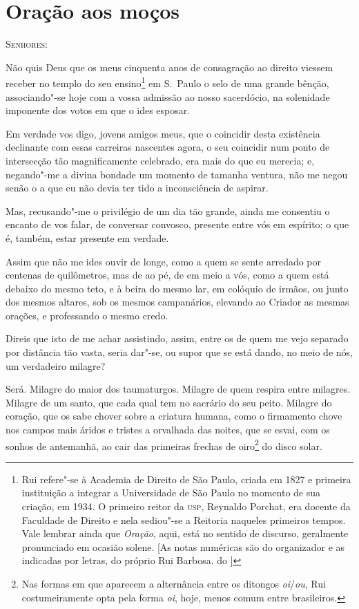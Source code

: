 \chapter*{Oração aos moços}

\textsc{Senhores:}

Não quis Deus que os meus cinquenta anos de consagração ao direito
viessem receber no templo do seu ensino\footnote{ Rui refere"-se à
Academia de Direito de São Paulo, criada em 1827 e primeira
instituição a integrar a Universidade de São Paulo no momento de sua
criação, em 1934. O primeiro reitor da \textsc{usp}, Reynaldo Porchat,
era docente da Faculdade de Direito e nela sediou"-se a Reitoria
naqueles primeiros tempos. Vale lembrar ainda que \textit{Oração}, aqui, 
está no sentido de discurso, geralmente pronunciado em ocasião solene. [As notas numéricas são 
do organizador e as indicadas por letras, do próprio Rui Barbosa.  do ]} 
em S.~Paulo o selo de uma grande bênção, associando"-se hoje com a 
vossa admissão ao nosso sacerdócio, na solenidade imponente dos votos em que o ides esposar.

Em verdade vos digo, jovens amigos meus, que o coincidir desta
existência declinante com essas carreiras nascentes agora, o seu
coincidir num ponto de intersecção tão magnificamente celebrado, era
mais do que eu merecia; e, negando"-me a divina bondade um momento de
tamanha ventura, não me negou senão o a que eu não devia ter tido a
inconsciência de aspirar.

Mas, recusando"-me o privilégio de um dia tão grande, ainda me
consentiu o encanto de vos falar, de conversar convosco, presente entre
vós em espírito; o que é, também, estar presente em verdade.

Assim que não me ides ouvir de longe, como a quem se sente
arredado por centenas de quilômetros, mas de ao pé, de em meio a vós,
como a quem está debaixo do mesmo teto, e à beira do mesmo lar, em
colóquio de irmãos, ou junto dos mesmos altares, sob os mesmos
campanários, elevando ao Criador as mesmas orações, e professando o
mesmo credo.

Direis que isto de me achar assistindo, assim, entre os de quem me
vejo separado por distância tão vasta, seria dar"-se, ou supor que se
está dando, no meio de nós, um verdadeiro milagre?

Será. Milagre do maior dos taumaturgos. Milagre de quem respira
entre milagres. Milagre de um santo, que cada qual tem no sacrário do
seu peito. Milagre do coração, que os sabe chover sobre a criatura
humana, como o firmamento chove nos campos mais áridos e tristes a
orvalhada das noites, que se esvai, com os sonhos de antemanhã, ao cair
das primeiras frechas de oiro\footnote{ Nas formas em que aparecem a
alternância entre os ditongos \textit{oi}/\textit{ou}, Rui
costumeiramente opta pela forma \textit{oi}, hoje, menos comum entre
brasileiros.} do disco solar.

